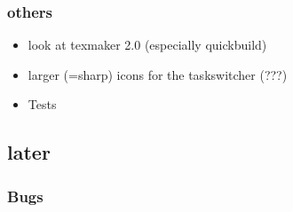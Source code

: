\documentclass[10pt,a4paper,landscape]{report}
\begin{document}
\subsubsection{others}
\begin{itemize}
\item look at texmaker 2.0 (especially quickbuild)
\item larger (=sharp) icons for the taskswitcher (???)
\item Tests
\end{itemize}


\subsection{later}

\subsubsection{Bugs}
\end{document}

